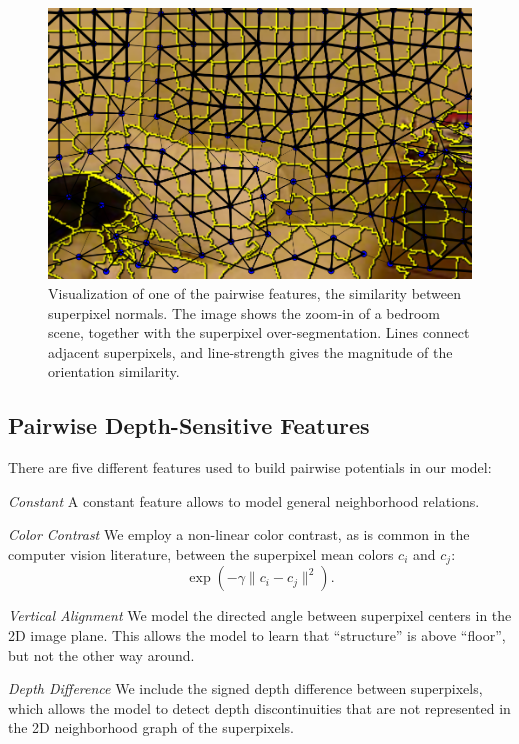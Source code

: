 \begin{figure}
    \begin{center}
        \includegraphics[width=\linewidth]{nyu/images/normal_feature}
    \end{center}
    \caption{%
        Visualization of one of the pairwise features, the similarity between superpixel normals.
        The image shows the zoom-in of a bedroom scene, together with the superpixel over-segmentation.
        Lines connect adjacent superpixels, and line-strength gives the magnitude of the orientation similarity.
    }
\end{figure}

\subsection{Pairwise Depth-Sensitive Features}
There are five different features used to build pairwise potentials in our model:

\emph{Constant}
    A constant feature allows to model general neighborhood relations.


\emph{Color Contrast}
    We employ a non-linear color contrast, as is common in the computer
    vision literature, between the superpixel mean colors $c_i$ and $c_j$:
    \[
        \exp\left(-\gamma \lVert c_i - c_j \rVert^2\right).
     \]


\emph{Vertical Alignment}
    We model the directed angle between superpixel centers in the 2D image
    plane.  This allows the  model to learn that ``structure'' is above
    ``floor'', but not the other way around.


\emph{Depth Difference}
    We include the signed depth difference between superpixels, which
    allows the model to detect depth discontinuities that are not
    represented in the 2D neighborhood graph of the superpixels.


